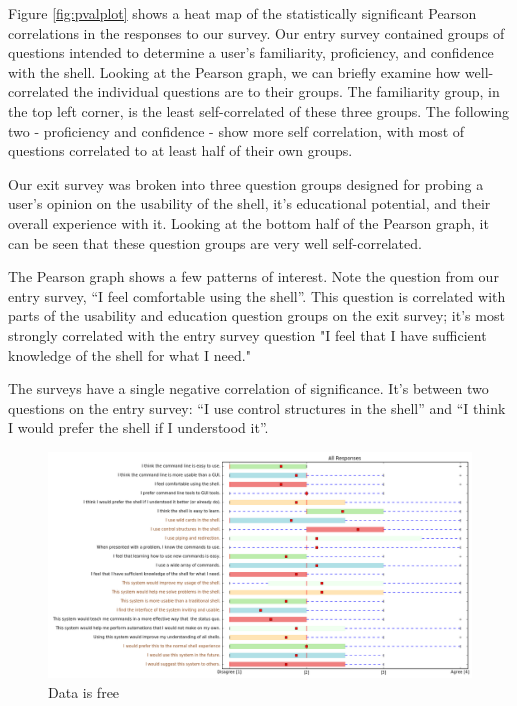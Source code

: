 Figure \ref{fig:pvalplot} shows a heat map of the statistically significant
Pearson correlations in the responses to our survey. Our entry survey contained
groups of questions intended to determine a user's familiarity, proficiency, and
confidence with the shell. Looking at the Pearson graph, we can briefly examine
how well-correlated the individual questions are to their groups. The
familiarity group, in the top left corner, is the least self-correlated of these
three groups. The following two \-- proficiency and confidence \-- show more
self correlation, with most of questions correlated to at least half of their
own groups.

Our exit survey was broken into three question groups designed for probing a
user's opinion on the usability of the shell, it's educational potential, and
their overall experience with it. Looking at the bottom half of the Pearson
graph, it can be seen that these question groups are very well self-correlated.

The Pearson graph shows a few patterns of interest. Note the question from our
entry survey, ``I feel comfortable using the shell''. This question is
correlated with parts of the usability and education question groups on the exit
survey; it's most strongly correlated with the entry survey question "I feel
that I have sufficient knowledge of the shell for what I need."

The surveys have a single negative correlation of significance. It's between two
questions on the entry survey: ``I use control structures in the shell'' and ``I
think I would prefer the shell if I understood it''.

\begin{figure}[H]
  \centering
  \includegraphics[width=\textwidth]{figures/stats/all.png}
  \caption{Data is free}
  \label{fig:alldata}
\end{figure}

